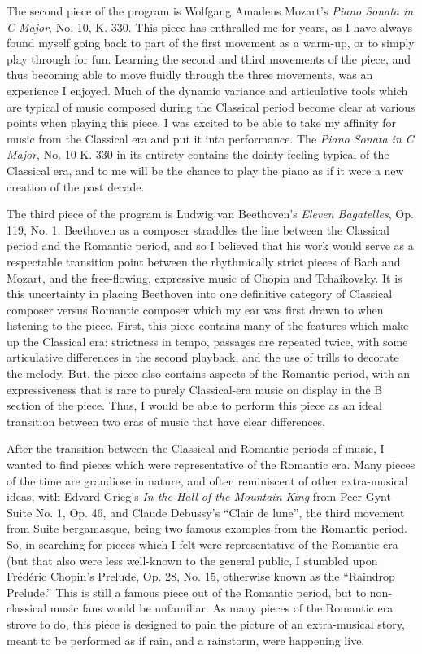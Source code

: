 The second piece of the program is Wolfgang Amadeus Mozart's \textit{Piano Sonata in C Major}, No. 10, K. 330. This piece has enthralled me for years, as I have always found myself going back to part of the first movement as a warm-up, or to simply play through for fun. Learning the second and third movements of the piece, and thus becoming able to move fluidly through the three movements, was an experience I enjoyed. Much of the dynamic variance and articulative tools which are typical of music composed during the Classical period become clear at various points when playing this piece. I was excited to be able to take my affinity for music from the Classical era and put it into performance. The \textit{Piano Sonata in C Major}, No. 10 K. 330 in its entirety contains the dainty feeling typical of the Classical era, and to me will be the chance to play the piano as if it were a new creation of the past decade. 

The third piece of the program is Ludwig van Beethoven's \textit{Eleven Bagatelles}, Op. 119, No. 1. Beethoven as a composer straddles the line between the Classical period and the Romantic period, and so I believed that his work would serve as a respectable transition point between the rhythmically strict pieces of Bach and Mozart, and the free-flowing, expressive music of Chopin and Tchaikovsky. It is this uncertainty in placing Beethoven into one definitive category of Classical composer versus Romantic composer which my ear was first drawn to when listening to the piece. First, this piece contains many of the features which make up the Classical era: strictness in tempo, passages are repeated twice, with some articulative differences in the second playback, and the use of trills to decorate the melody. But, the piece also contains aspects of the Romantic period, with an expressiveness that is rare to purely Classical-era music on display in the B section of the piece. Thus, I would be able to perform this piece as an ideal transition between two eras of music that have clear differences.

After the transition between the Classical and Romantic periods of music, I wanted to find pieces which were representative of the Romantic era. Many pieces of the time are grandiose in nature, and often reminiscent of other extra-musical ideas, with Edvard Grieg's \textit{In the Hall of the Mountain King} from Peer Gynt Suite No. 1, Op. 46, and Claude Debussy's ``Clair de lune'', the third movement from Suite bergamasque, being two famous examples from the Romantic period. So, in searching for pieces which I felt were representative of the Romantic era (but that also were less well-known to the general public, I stumbled upon Frédéric Chopin's Prelude, Op. 28, No. 15, otherwise known as the ``Raindrop Prelude.'' This is still a famous piece out of the Romantic period, but to non-classical music fans would be unfamiliar. As many pieces of the Romantic era strove to do, this piece is designed to pain the picture of an extra-musical story, meant to be performed as if rain, and a rainstorm, were happening live. 

